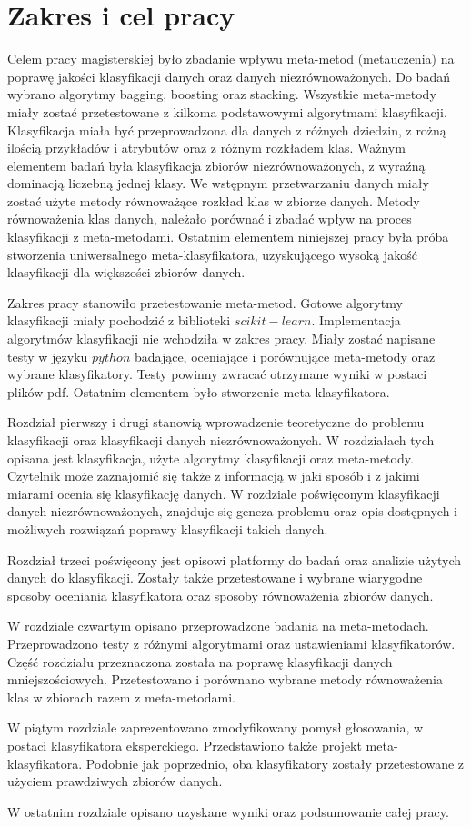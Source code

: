 \chapter*{Zakres i cel pracy}
Celem pracy magisterskiej było zbadanie wpływu meta-metod (metauczenia) na poprawę jakości klasyfikacji danych oraz danych niezrównoważonych. Do badań wybrano algorytmy bagging, boosting oraz stacking. Wszystkie meta-metody miały zostać przetestowane z kilkoma podstawowymi algorytmami klasyfikacji. Klasyfikacja miała być przeprowadzona dla danych z różnych dziedzin, z rożną ilością przykładów i atrybutów oraz z różnym rozkładem klas. Ważnym elementem badań była klasyfikacja zbiorów niezrównoważonych, z wyraźną dominacją liczebną jednej klasy. We wstępnym przetwarzaniu danych miały zostać użyte metody równoważące rozkład klas w zbiorze danych. Metody równoważenia klas danych, należało porównać i zbadać wpływ na proces klasyfikacji z meta-metodami. Ostatnim elementem niniejszej pracy była próba stworzenia uniwersalnego meta-klasyfikatora, uzyskującego wysoką jakość klasyfikacji dla większości zbiorów danych. \par
Zakres pracy stanowiło przetestowanie meta-metod. Gotowe algorytmy klasyfikacji miały pochodzić z biblioteki $scikit-learn$. Implementacja algorytmów klasyfikacji nie wchodziła w zakres pracy. Miały zostać napisane testy w języku $python$ badające, oceniające i porównujące meta-metody oraz wybrane klasyfikatory. Testy powinny zwracać otrzymane wyniki w postaci plików pdf. Ostatnim elementem było stworzenie meta-klasyfikatora. \par
Rozdział pierwszy i drugi stanowią wprowadzenie teoretyczne do problemu klasyfikacji oraz klasyfikacji danych niezrównoważonych. W rozdziałach tych opisana jest klasyfikacja, użyte algorytmy klasyfikacji oraz meta-metody. Czytelnik może zaznajomić się także z informacją w jaki sposób i z jakimi miarami ocenia się klasyfikację danych. W rozdziale poświęconym klasyfikacji danych niezrównoważonych, znajduje się geneza problemu oraz opis dostępnych i możliwych rozwiązań poprawy klasyfikacji takich danych. \par
Rozdział trzeci poświęcony jest opisowi platformy do badań oraz analizie użytych danych do klasyfikacji. Zostały także przetestowane i wybrane wiarygodne sposoby oceniania klasyfikatora oraz sposoby równoważenia zbiorów danych. \par
W rozdziale czwartym opisano przeprowadzone badania na meta-metodach. Przeprowadzono testy z różnymi algorytmami oraz ustawieniami klasyfikatorów. Część rozdziału przeznaczona została na poprawę klasyfikacji danych mniejszościowych. Przetestowano i porównano wybrane metody równoważenia klas w zbiorach razem z meta-metodami. \par
W piątym rozdziale zaprezentowano zmodyfikowany pomysł głosowania, w postaci klasyfikatora eksperckiego. Przedstawiono także projekt meta-klasyfikatora. Podobnie jak poprzednio, oba klasyfikatory zostały przetestowane z użyciem prawdziwych zbiorów danych. \par
W ostatnim rozdziale opisano uzyskane wyniki oraz podsumowanie całej pracy.